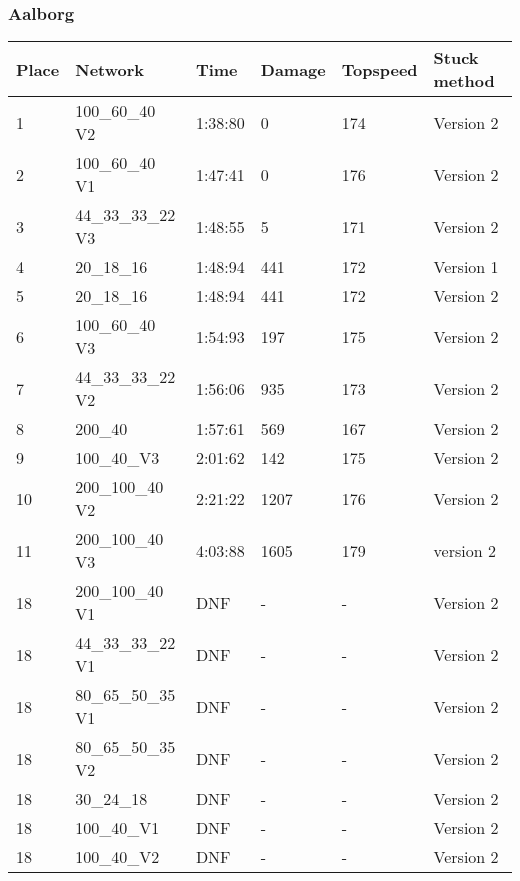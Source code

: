 \subsubsection*{Aalborg}
\begin{table}[H]
\begin{tabular}{llllll}
 \textbf{Place} & \textbf{Network} & \textbf{Time} & \textbf{Damage} & \textbf{Topspeed}  & \textbf{Stuck method} \\ \hline
 1 & 100\_60\_40 V2  & 1:38:80  & 0 & 174 & Version 2   \\ 
 2 & 100\_60\_40 V1 & 1:47:41 & 0 & 176 & Version 2 \\
 3 & 44\_33\_33\_22 V3  & 1:48:55 & 5 & 171 & Version 2 \\
 4 & 20\_18\_16  & 1:48:94 & 441 & 172 & Version 1 \\
 5 & 20\_18\_16   & 1:48:94 & 441 & 172 & Version 2 \\
 6 & 100\_60\_40 V3 & 1:54:93  & 197 & 175 & Version 2   \\  
 7 & 44\_33\_33\_22 V2  & 1:56:06 & 935 & 173 & Version 2 \\
 8 & 200\_40  &  1:57:61 & 569 & 167 & Version 2 \\ 
 9 & 100\_40\_V3  & 2:01:62 & 142 & 175 & Version 2 \\
 10 & 200\_100\_40 V2  & 2:21:22 & 1207 & 176 & Version 2 \\
 11 & 200\_100\_40 V3 & 4:03:88 & 1605 & 179 & version 2 \\
 18 & 200\_100\_40 V1  & DNF & - & - & Version 2 \\
 18 & 44\_33\_33\_22 V1  & DNF & - & - & Version 2 \\ 
 18 & 80\_65\_50\_35 V1  & DNF & - & - & Version 2 \\
 18 & 80\_65\_50\_35 V2  & DNF & - & - & Version 2 \\
 18 & 30\_24\_18   &  DNF & - & - & Version 2 \\
 18 & 100\_40\_V1  & DNF & - & - & Version 2 \\
 18 & 100\_40\_V2 & DNF & - & - & Version 2 \\
\end{tabular}
\end{table}
